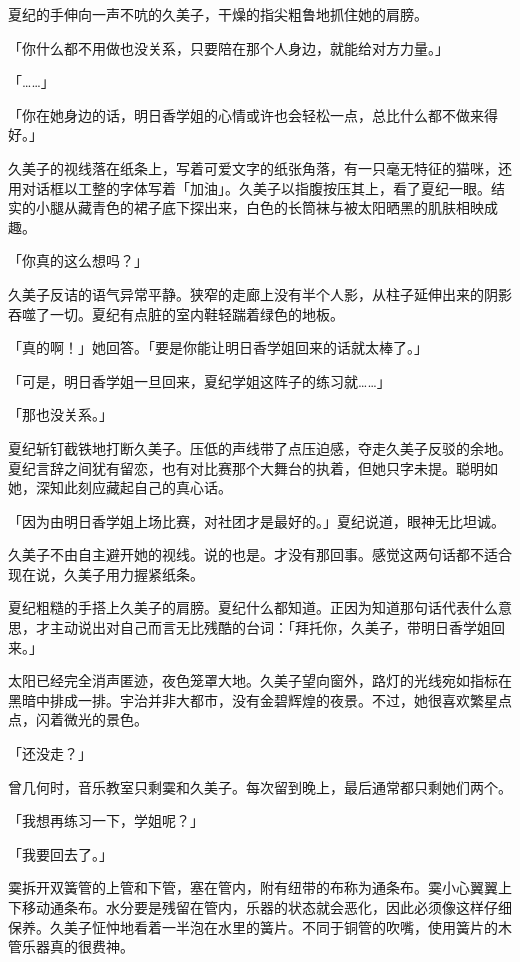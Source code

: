 \documentclass[UTF8]{ctexart}
\begin{document}
    夏纪的手伸向一声不吭的久美子，干燥的指尖粗鲁地抓住她的肩膀。 

    「你什么都不用做也没关系，只要陪在那个人身边，就能给对方力量。」 

    「……」 

    「你在她身边的话，明日香学姐的心情或许也会轻松一点，总比什么都不做来得好。」 

    久美子的视线落在纸条上，写着可爱文字的纸张角落，有一只毫无特征的猫咪，还用对话框以工整的字体写着「加油」。久美子以指腹按压其上，看了夏纪一眼。结实的小腿从藏青色的裙子底下探出来，白色的长筒袜与被太阳晒黑的肌肤相映成趣。 

    「你真的这么想吗？」 

    久美子反诘的语气异常平静。狭窄的走廊上没有半个人影，从柱子延伸出来的阴影吞噬了一切。夏纪有点脏的室内鞋轻踹着绿色的地板。 

    「真的啊！」她回答。「要是你能让明日香学姐回来的话就太棒了。」 

    「可是，明日香学姐一旦回来，夏纪学姐这阵子的练习就……」 

    「那也没关系。」 

    夏纪斩钉截铁地打断久美子。压低的声线带了点压迫感，夺走久美子反驳的余地。夏纪言辞之间犹有留恋，也有对比赛那个大舞台的执着，但她只字未提。聪明如她，深知此刻应藏起自己的真心话。 

    「因为由明日香学姐上场比赛，对社团才是最好的。」夏纪说道，眼神无比坦诚。 

    久美子不由自主避开她的视线。说的也是。才没有那回事。感觉这两句话都不适合现在说，久美子用力握紧纸条。 

    夏纪粗糙的手搭上久美子的肩膀。夏纪什么都知道。正因为知道那句话代表什么意思，才主动说出对自己而言无比残酷的台词：「拜托你，久美子，带明日香学姐回来。」 

    太阳已经完全消声匿迹，夜色笼罩大地。久美子望向窗外，路灯的光线宛如指标在黑暗中排成一排。宇治并非大都市，没有金碧辉煌的夜景。不过，她很喜欢繁星点点，闪着微光的景色。 

    「还没走？」 

    曾几何时，音乐教室只剩霙和久美子。每次留到晚上，最后通常都只剩她们两个。 

    「我想再练习一下，学姐呢？」 

    「我要回去了。」 

    霙拆开双簧管的上管和下管，塞在管内，附有纽带的布称为通条布。霙小心翼翼上下移动通条布。水分要是残留在管内，乐器的状态就会恶化，因此必须像这样仔细保养。久美子怔忡地看着一半泡在水里的簧片。不同于铜管的吹嘴，使用簧片的木管乐器真的很费神。 
\end{document}
